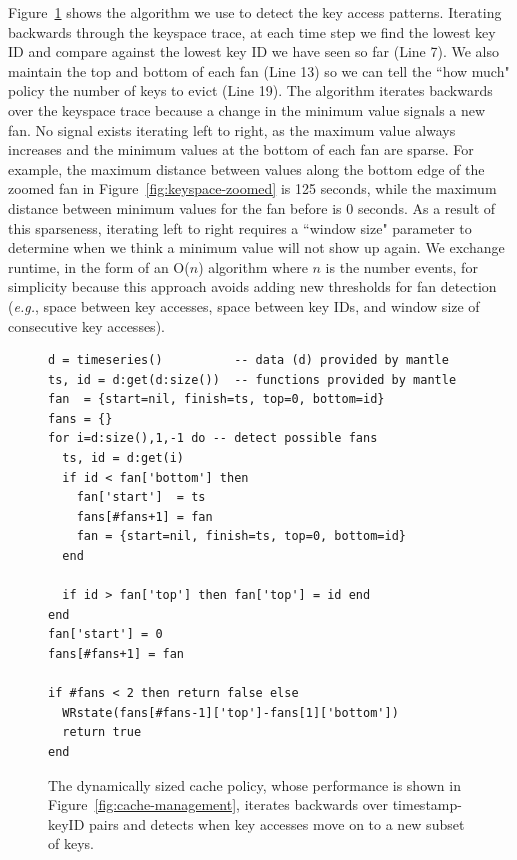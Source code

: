 Figure~\ref{src:dyn-cache} shows the algorithm we use to detect the key access
patterns. Iterating backwards through the keyspace trace, at each time step we
find the lowest key ID and compare against the lowest key ID we have seen so
far (Line 7). We also maintain the top and bottom of each fan (Line 13) so we
can tell the ``how much" policy the number of keys to evict (Line 19).  The
algorithm iterates backwards over the keyspace trace because a change in the
minimum value signals a new fan. No signal exists iterating left to right, as
the maximum value always increases and the minimum values at the bottom of each
fan are sparse.  For example, the maximum distance between values along the
bottom edge of the zoomed fan in Figure~\ref{fig:keyspace-zoomed} is 125
seconds, while the maximum distance between minimum values for the fan before
is 0 seconds. As a result of this sparseness, iterating left to right requires
a ``window size" parameter to determine when we think a minimum value will not
show up again.  We exchange runtime, in the form of an O(\(n\)) algorithm where
\(n\) is the number events, for simplicity because this approach avoids adding
new thresholds for fan detection ({\it e.g.}, space between key accesses, space
between key IDs, and window size of consecutive key accesses).


\begin{figure}[h]
\footnotesize
\begin{verbatim}
d = timeseries()          -- data (d) provided by mantle
ts, id = d:get(d:size())  -- functions provided by mantle
fan  = {start=nil, finish=ts, top=0, bottom=id}
fans = {}
for i=d:size(),1,-1 do -- detect possible fans
  ts, id = d:get(i)
  if id < fan['bottom'] then
    fan['start']  = ts
    fans[#fans+1] = fan 
    fan = {start=nil, finish=ts, top=0, bottom=id}
  end 

  if id > fan['top'] then fan['top'] = id end 
end
fan['start'] = 0 
fans[#fans+1] = fan 

if #fans < 2 then return false else
  WRstate(fans[#fans-1]['top']-fans[1]['bottom'])
  return true
end
\end{verbatim}
\caption{The dynamically sized cache policy, whose performance is shown in 
Figure~\ref{fig:cache-management}, iterates backwards over timestamp-keyID pairs
and detects when key accesses move on to a new subset of
keys.\label{src:dyn-cache}}
\end{figure}
